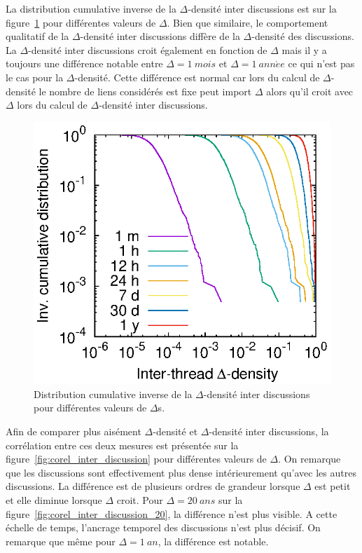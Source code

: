 La distribution cumulative inverse de la $\Delta$-densité inter discussions est sur la figure~\ref{fig:inter_dens_discussion} pour différentes valeurs de $\Delta$.
Bien que similaire, le comportement qualitatif de la $\Delta$-densité inter discussions diffère de la $\Delta$-densité des discussions.
La $\Delta$-densité inter discussions croit également en fonction de $\Delta$ mais il y a toujours une différence notable entre $\Delta= 1\  mois$ et $\Delta= 1\ ann\acute{e}e$ ce qui n'est pas le cas pour la $\Delta$-densité.
Cette différence est normal car lors du calcul de $\Delta$-densité le nombre de liens considérés est fixe peut import $\Delta$ alors qu'il croit avec $\Delta$ lors du calcul de $\Delta$-densité inter discussions.
\begin{figure}
\centering
	\includegraphics[width=0.48\linewidth]{img/mailing/inter_delta.eps}
\caption{Distribution cumulative inverse de la $\Delta$-densité inter discussions pour différentes valeurs de $\Delta$s.}
\label{fig:inter_dens_discussion}
\end{figure}


Afin de comparer plus aisément $\Delta$-densité et $\Delta$-densité inter discussions, la corrélation entre ces deux mesures est présentée sur la figure~\ref{fig:corel_inter_discussion} pour différentes valeurs de $\Delta$.
On remarque que les discussions sont effectivement plus dense intérieurement qu'avec les autres discussions.
La différence est de plusieurs ordres de grandeur lorsque $\Delta$ est petit et elle diminue lorsque $\Delta$ croit.
Pour $\Delta=20\ ans$ sur la figure~\ref{fig:corel_inter_discussion_20}, la différence n'est plus visible.
A cette échelle de temps, l'ancrage temporel des discussions n'est plus décisif.
On remarque que même pour $\Delta=1\ an$, la différence est notable.
 

